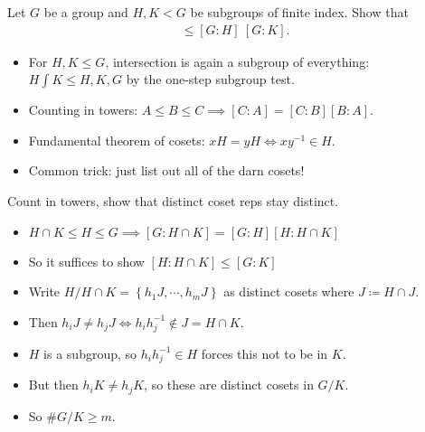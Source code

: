 Let \(G\) be a group and \(H, K < G\) be subgroups of finite index. Show
that
\begin{align*}
[G: H\cap K] \leq [G: H] ~ [G:K]
.\end{align*}

\begin{concept}

\envlist

\begin{itemize}
\tightlist
\item
  For \(H, K\leq G\), intersection is again a subgroup of everything:
  \(H\int K \leq H, K, G\) by the one-step subgroup test.
\item
  Counting in towers: \(A\leq B \leq C \implies [C:A] = [C:B][B:A]\).
\item
  Fundamental theorem of cosets: \(xH = yH \iff xy^{-1}\in H\).
\item
  Common trick: just list out all of the darn cosets!
\end{itemize}

\end{concept}

\begin{strategy}

Count in towers, show that distinct coset reps stay distinct.

\end{strategy}

\begin{solution}

\envlist

\begin{itemize}
\tightlist
\item
  \(H \cap K \leq H \leq G \implies [G: H \cap K] = [G: H] [H : H \cap K]\)
\item
  So it suffices to show \([H: H \cap K] \leq [G: K]\)
\item
  Write \(H/H \cap K = \left\{{ h_1 J, \cdots, h_m J }\right\}\) as
  distinct cosets where \(J \coloneqq H \cap J\).
\item
  Then \(h_i J\neq h_j J \iff h_i h_j^{-1}\not\in J = H \cap K\).
\item
  \(H\) is a subgroup, so \(h_i h_j^{-1}\in H\) forces this not to be in
  \(K\).
\item
  But then \(h_i K \neq h_j K\), so these are distinct cosets in
  \(G/K\).
\item
  So \(\#G/K \geq m\).
\end{itemize}

\end{solution}

